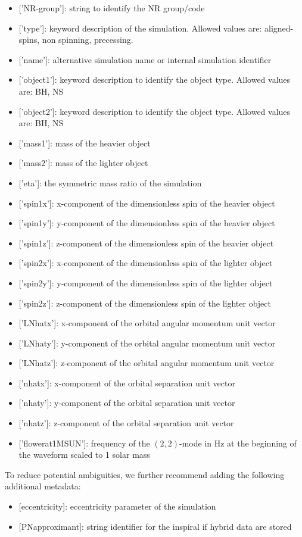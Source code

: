 \documentclass[aps,prd,amssymb,amsmath,amsfonts,superscriptaddress,
floatfix ,preprintnumbers,altaffilletter]{revtex4}
\begin{document}
\begin{itemize}
\item {[}'NR-group'{]}: string to identify the NR group/code
\item {[}'type'{]}: keyword description of the simulation. Allowed values are: aligned-spins, non spinning, precessing.
\item{[}'name'{]}: alternative simulation name or internal simulation identifier
\item{[}'object1'{]}: keyword description to identify the object type. Allowed values are: BH, NS
\item {[}'object2'{]}: keyword description to identify the object type. Allowed values are: BH, NS
\item{[}'mass1'{]}: mass of the heavier object
\item{[}'mass2'{]}: mass of the lighter object
\item{[}'eta'{]}: the symmetric mass ratio of the simulation
\item{[}'spin1x'{]}: x-component of the dimensionless spin of the heavier object
\item{[}'spin1y'{]}: y-component of the dimensionless spin of the heavier object 
\item{[}'spin1z'{]}: z-component of the dimensionless spin of the heavier object
\item{[}'spin2x'{]}: x-component of the dimensionless spin of the lighter object
\item{[}'spin2y'{]}: y-component of the dimensionless spin of the lighter object 
\item{[}'spin2z'{]}: z-component of the dimensionless spin of the lighter object
\item{[}'LNhatx'{]}: x-component of the orbital angular momentum unit vector
\item{[}'LNhaty'{]}: y-component of the orbital angular momentum unit vector
\item{[}'LNhatz'{]}: z-component of the orbital angular momentum unit vector
\item{[}'nhatx'{]}: x-component of the orbital separation unit vector
\item{[}'nhaty'{]}: y-component of the orbital separation unit vector
\item{[}'nhatz'{]}: z-component of the orbital separation unit vector
\item{[}'f\textunderscore lower\textunderscore at\textunderscore 1MSUN'{]}: frequency of the $(2,2)$-mode in Hz at the beginning of the waveform scaled to 1 solar mass
\end{itemize}
To reduce potential ambiguities, we further recommend adding the following  additional metadata:
\begin{itemize}
\item{[}eccentricity{]}: eccentricity parameter of the simulation
\item{[}PN\textunderscore approximant{]}: string identifier for the inspiral if hybrid data are stored
\end{itemize}
\end{document}
